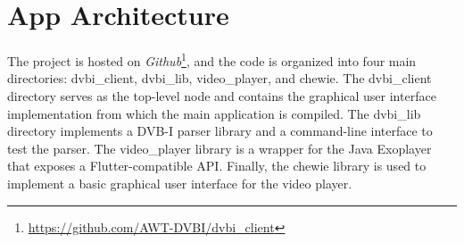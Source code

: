 \documentclass[conference]{IEEEtran}
\begin{document}

\section{App Architecture}\label{arch}

The project is hosted on  \emph{Github}\footnote{\url{https://github.com/AWT-DVBI/dvbi_client}}, and the code is organized into four main directories: dvbi\_client, dvbi\_lib, video\_player, and chewie. The dvbi\_client directory serves as the top-level node and contains the graphical user interface implementation from which the main application is compiled. The dvbi\_lib directory implements a DVB-I parser library and a command-line interface to test the parser. The video\_player library is a wrapper for the Java Exoplayer that exposes a Flutter-compatible API. Finally, the chewie library is used to implement a basic graphical user interface for the video player. 
\end{document}
